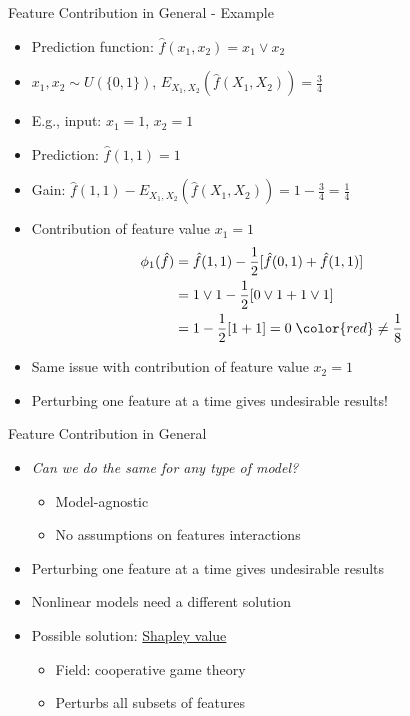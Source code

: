 \documentclass[dvipsnames]{beamer}
\newcommand{\red}[1]{{\color{red} #1}}
\begin{document}


\begin{frame}{Feature Contribution in General - Example}
	\begin{itemize}
		\item<1-> Prediction function: $\hat{f}(x_1, x_2) = x_1 \lor x_2$
		\item<1-> $x_1, x_2 \sim U(\{0, 1\})$, $E_{X_1,X_2}(\hat{f}(X_1,X_2)) = \frac{3}{4}$
		\item<1-> E.g., input: $x_1 = 1$, $x_2 = 1$
		\item<1-> Prediction: $\hat{f}(1, 1) = 1$
		\item<1-> Gain: $\hat{f}(1, 1) - E_{X_1,X_2}(\hat{f}(X_1,X_2)) = 1 - \frac{3}{4} = \frac{1}{4}$
		\item<1-> Contribution of feature value $x_1 = 1$
		\begin{align}\begin{split}
			\phi_1(\hat{f}) 
			&=\hat{f}(1, 1)-\frac{1}{2} [\hat{f}(0, 1) + \hat{f}(1, 1)]\\
			&=1 \lor 1-\frac{1}{2} [0 \lor 1 + 1 \lor 1]\\
			&=1 -\frac{1}{2} [1 + 1] = 0 \; \red{\neq \frac{1}{8}}
		\end{split}\end{align}
		\item<1-> Same issue with contribution of feature value $x_2 = 1$
		\vspace{1em}
		\item<2-> \red{Perturbing one feature at a time gives undesirable results!}
	\end{itemize}
\end{frame}

\begin{frame}{Feature Contribution in General}
	\begin{itemize}
		\item<1-> \emph{Can we do the same for any type of model?}
		\begin{itemize}
			\item Model-agnostic
			\item No assumptions on features interactions
		\end{itemize}
		\vspace{2em}
		\item<2-> Perturbing one feature at a time gives undesirable results
		\item<2-> Nonlinear models need a different solution
		\vspace{2em}
		\item<3-> Possible solution: \underline{Shapley value}
		\begin{itemize}
			\item Field: cooperative game theory
			\item Perturbs all subsets of features
		\end{itemize}
	\end{itemize}
\end{frame}
\end{document}
